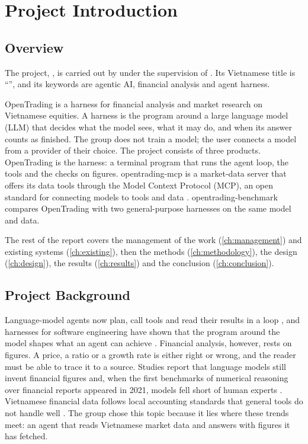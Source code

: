 \chapter{Project Introduction}\label{ch:introduction}

\section{Overview}\label{sec:overview}
\label{sec:project-information}
The project, , is carried out by  under the supervision of .
Its Vietnamese title is \enquote{}, and its keywords are agentic AI, financial analysis and agent harness.

\label{sec:project-overview}
OpenTrading is a harness for financial analysis and market research on Vietnamese equities.
A harness is the program around a large language model (LLM) that decides what the model sees, what it may do, and when its answer counts as finished.
The group does not train a model; the user connects a model from a provider of their choice.
The project consists of three products.
OpenTrading is the harness: a terminal program that runs the agent loop, the tools and the checks on figures.
opentrading-mcp is a market-data server that offers its data tools through the Model Context Protocol (MCP), an open standard for connecting models to tools and data \parencite{anthropic2024introducing}.
opentrading-benchmark compares OpenTrading with two general-purpose harnesses on the same model and data.

The rest of the report covers the management of the work (\cref{ch:management}) and existing systems (\cref{ch:existing}), then the methods (\cref{ch:methodology}), the design (\cref{ch:design}), the results (\cref{ch:results}) and the conclusion (\cref{ch:conclusion}).

\section{Project Background}\label{sec:background}
Language-model agents now plan, call tools and read their results in a loop \parencite{xi2025rise,sapkota2026agents}, and harnesses for software engineering have shown that the program around the model shapes what an agent can achieve \parencite{yang2024sweagent,wang2025openhands}.
Financial analysis, however, rests on figures.
A price, a ratio or a growth rate is either right or wrong, and the reader must be able to trace it to a source.
Studies report that language models still invent financial figures \parencite{kang2023deficiency} and, when the first benchmarks of numerical reasoning over financial reports appeared in 2021, models fell short of human experts \parencite{chen2021finqa,zhu2021tatqa}.
Vietnamese financial data follows local accounting standards that general tools do not handle well \parencite{nguyen2025finstat2sql}.
The group chose this topic because it lies where these trends meet: an agent that reads Vietnamese market data and answers with figures it has fetched.

